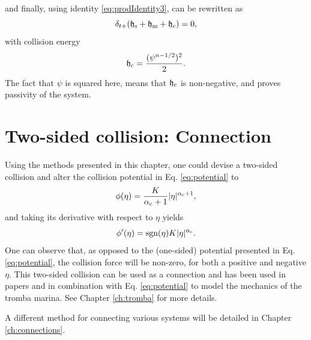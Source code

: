 and finally, using identity \eqref{eq:prodIdentity3}, can be rewritten as
\begin{equation}
    \delta_{t+}(\mathfrak{h}_\text{s} + \mathfrak{h}_\text{m} + \mathfrak{h}_\text{c}) = 0,
\end{equation}
with collision energy
\begin{equation*}
    \mathfrak{h}_\text{c} = \frac{(\psi^{n-1/2})^2}{2}.
\end{equation*}
The fact that $\psi$ is squared here, means that $\mathfrak{h}_\text{c}$ is non-negative, and proves passivity of the system. 

\section{Two-sided collision: Connection}\label{sec:twoSidedCollision}
Using the methods presented in this chapter, one could devise a two-sided collision and alter the collision potential in Eq. \eqref{eq:potential} to \cite{Bilbao2019}
\begin{equation}\label{eq:twoSidedPotential}
    \phi(\eta) = \frac{K}{\alpha_{\text{c}}+1}|\eta|^{\alpha_{\text{c}}+1},
\end{equation}
and taking its derivative with respect to $\eta$ yields
\begin{equation}
    \phi'(\eta) = \text{sgn}(\eta)K|\eta|^{\alpha_{\text{c}}}.
\end{equation}
One can observe that, as opposed to the (one-sided) potential presented in Eq. \eqref{eq:potential}, the collision force will be non-zero, for both a positive and negative $\eta$. This two-sided collision can be used as a connection and has been used in papers \citeP[D] and \citeP[E] in combination with Eq. \eqref{eq:potential} to model the mechanics of the tromba marina. See Chapter \ref{ch:tromba} for more details.

A different method for connecting various systems will be detailed in Chapter \ref{ch:connections}.
